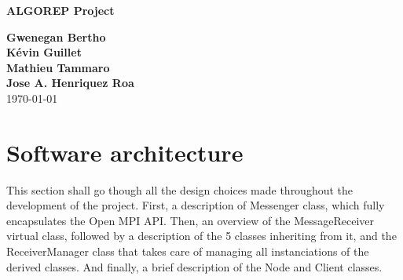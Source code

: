 \documentclass[11pt]{article}
\begin{document}
\begin{titlepage}
  \begin{center}
    \Huge \textbf{ALGOREP Project}\\
    
  \end{center}
  \vfill\normalsize
  \tableofcontents

  \begin{center}
    \vfill\normalsize
    \textbf{Gwenegan Bertho}\\ \normalsize \textbf{Kévin
      Guillet}\\ \normalsize \textbf{Mathieu Tammaro}\\ \normalsize \textbf{Jose
      A. Henriquez Roa}\\
    \vspace*{2\baselineskip} \today \rhead{\today}
    \newpage
  \end{center}
\end{titlepage}
\section{Software architecture}
This section shall go though all the design choices made throughout the
development of the project. First, a description of Messenger class, which fully
encapsulates the Open MPI API. Then, an overview of the MessageReceiver virtual
class, followed by a description of the 5 classes inheriting from it, and the
ReceiverManager class that takes care of managing all instanciations of the
derived classes. And finally, a brief description of the Node and Client
classes.
\end{document}
